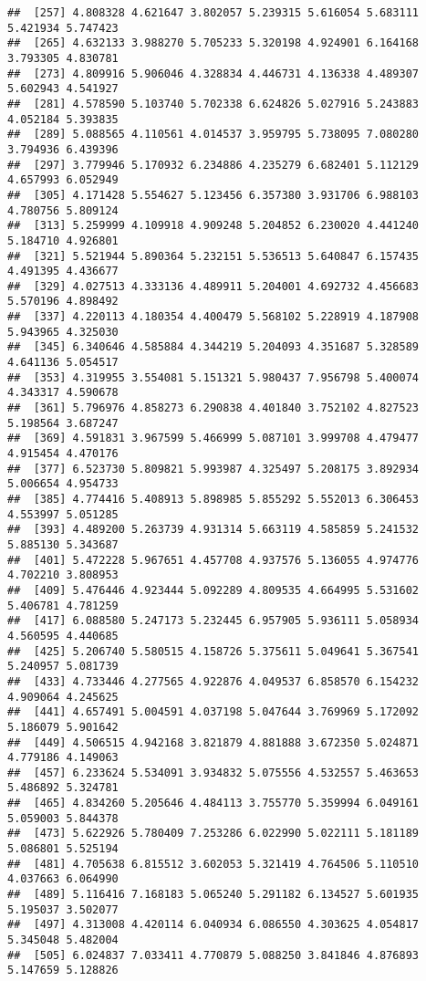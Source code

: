 \documentclass[
]{article}
\begin{document}
\begin{verbatim}
##  [257] 4.808328 4.621647 3.802057 5.239315 5.616054 5.683111 5.421934 5.747423
##  [265] 4.632133 3.988270 5.705233 5.320198 4.924901 6.164168 3.793305 4.830781
##  [273] 4.809916 5.906046 4.328834 4.446731 4.136338 4.489307 5.602943 4.541927
##  [281] 4.578590 5.103740 5.702338 6.624826 5.027916 5.243883 4.052184 5.393835
##  [289] 5.088565 4.110561 4.014537 3.959795 5.738095 7.080280 3.794936 6.439396
##  [297] 3.779946 5.170932 6.234886 4.235279 6.682401 5.112129 4.657993 6.052949
##  [305] 4.171428 5.554627 5.123456 6.357380 3.931706 6.988103 4.780756 5.809124
##  [313] 5.259999 4.109918 4.909248 5.204852 6.230020 4.441240 5.184710 4.926801
##  [321] 5.521944 5.890364 5.232151 5.536513 5.640847 6.157435 4.491395 4.436677
##  [329] 4.027513 4.333136 4.489911 5.204001 4.692732 4.456683 5.570196 4.898492
##  [337] 4.220113 4.180354 4.400479 5.568102 5.228919 4.187908 5.943965 4.325030
##  [345] 6.340646 4.585884 4.344219 5.204093 4.351687 5.328589 4.641136 5.054517
##  [353] 4.319955 3.554081 5.151321 5.980437 7.956798 5.400074 4.343317 4.590678
##  [361] 5.796976 4.858273 6.290838 4.401840 3.752102 4.827523 5.198564 3.687247
##  [369] 4.591831 3.967599 5.466999 5.087101 3.999708 4.479477 4.915454 4.470176
##  [377] 6.523730 5.809821 5.993987 4.325497 5.208175 3.892934 5.006654 4.954733
##  [385] 4.774416 5.408913 5.898985 5.855292 5.552013 6.306453 4.553997 5.051285
##  [393] 4.489200 5.263739 4.931314 5.663119 4.585859 5.241532 5.885130 5.343687
##  [401] 5.472228 5.967651 4.457708 4.937576 5.136055 4.974776 4.702210 3.808953
##  [409] 5.476446 4.923444 5.092289 4.809535 4.664995 5.531602 5.406781 4.781259
##  [417] 6.088580 5.247173 5.232445 6.957905 5.936111 5.058934 4.560595 4.440685
##  [425] 5.206740 5.580515 4.158726 5.375611 5.049641 5.367541 5.240957 5.081739
##  [433] 4.733446 4.277565 4.922876 4.049537 6.858570 6.154232 4.909064 4.245625
##  [441] 4.657491 5.004591 4.037198 5.047644 3.769969 5.172092 5.186079 5.901642
##  [449] 4.506515 4.942168 3.821879 4.881888 3.672350 5.024871 4.779186 4.149063
##  [457] 6.233624 5.534091 3.934832 5.075556 4.532557 5.463653 5.486892 5.324781
##  [465] 4.834260 5.205646 4.484113 3.755770 5.359994 6.049161 5.059003 5.844378
##  [473] 5.622926 5.780409 7.253286 6.022990 5.022111 5.181189 5.086801 5.525194
##  [481] 4.705638 6.815512 3.602053 5.321419 4.764506 5.110510 4.037663 6.064990
##  [489] 5.116416 7.168183 5.065240 5.291182 6.134527 5.601935 5.195037 3.502077
##  [497] 4.313008 4.420114 6.040934 6.086550 4.303625 4.054817 5.345048 5.482004
##  [505] 6.024837 7.033411 4.770879 5.088250 3.841846 4.876893 5.147659 5.128826

\end{verbatim}
\end{document}
